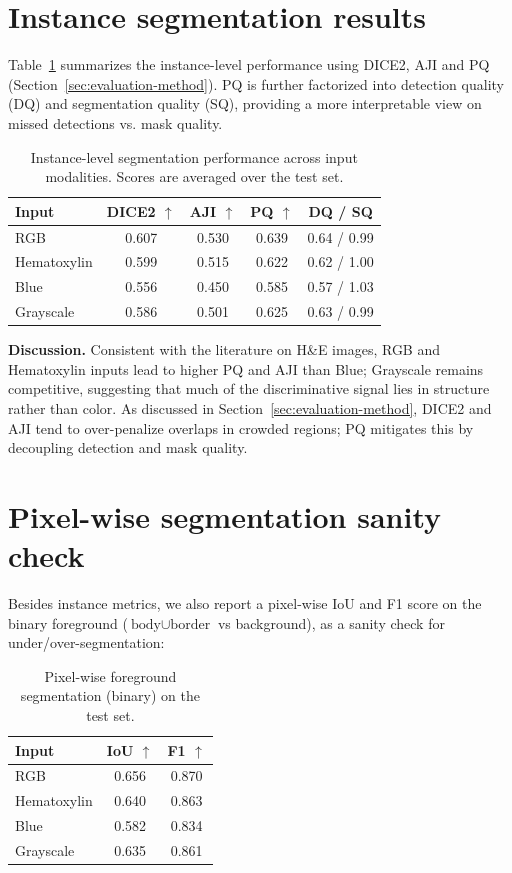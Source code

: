 \documentclass[target=bach,aauheader=,style=]{thud}
\begin{document}
\section{Instance segmentation results}
Table~\ref{tab:iou-results} summarizes the instance-level performance using DICE2, AJI and PQ (Section~\ref{sec:evaluation-method}). 
PQ is further factorized into detection quality (DQ) and segmentation quality (SQ), providing a more interpretable view on missed detections vs. mask quality.

\begin{table}[ht]
\centering
\caption{Instance-level segmentation performance across input modalities. Scores are averaged over the test set.}
\label{tab:iou-results}
\small
\begin{tabular}{lcccc}
\toprule
\textbf{Input} & \textbf{DICE2} $\uparrow$ & \textbf{AJI} $\uparrow$ & \textbf{PQ} $\uparrow$ & \textbf{DQ / SQ} \\
\midrule
RGB         & 0.607 & 0.530 & 0.639 & 0.64 / 0.99 \\
Hematoxylin & 0.599 & 0.515 & 0.622 & 0.62 / 1.00 \\
Blue        & 0.556 & 0.450 & 0.585 & 0.57 / 1.03 \\
Grayscale   & 0.586 & 0.501 & 0.625 & 0.63 / 0.99 \\
\bottomrule
\end{tabular}
\end{table}

\noindent\textbf{Discussion.} 
Consistent with the literature on H\&E images, RGB and Hematoxylin inputs lead to higher PQ and AJI than Blue; Grayscale remains competitive, suggesting that much of the discriminative signal lies in structure rather than color. 
As discussed in Section~\ref{sec:evaluation-method}, DICE2 and AJI tend to over-penalize overlaps in crowded regions; PQ mitigates this by decoupling detection and mask quality.

\section{Pixel-wise segmentation sanity check}
Besides instance metrics, we also report a pixel-wise IoU and F1 score on the binary foreground ($\text{body}\cup\text{border}$ vs background), as a sanity check for under/over-segmentation:

\begin{table}[ht]
\centering
\caption{Pixel-wise foreground segmentation (binary) on the test set.}
\label{tab:pix-binary}
\small
\begin{tabular}{lcc}
\toprule
\textbf{Input} & \textbf{IoU} $\uparrow$ & \textbf{F1} $\uparrow$ \\
\midrule
RGB         & 0.656 & 0.870 \\
Hematoxylin & 0.640 & 0.863 \\
Blue        & 0.582 & 0.834 \\
Grayscale   & 0.635 & 0.861 \\
\bottomrule
\end{tabular}
\end{table}
\end{document}
